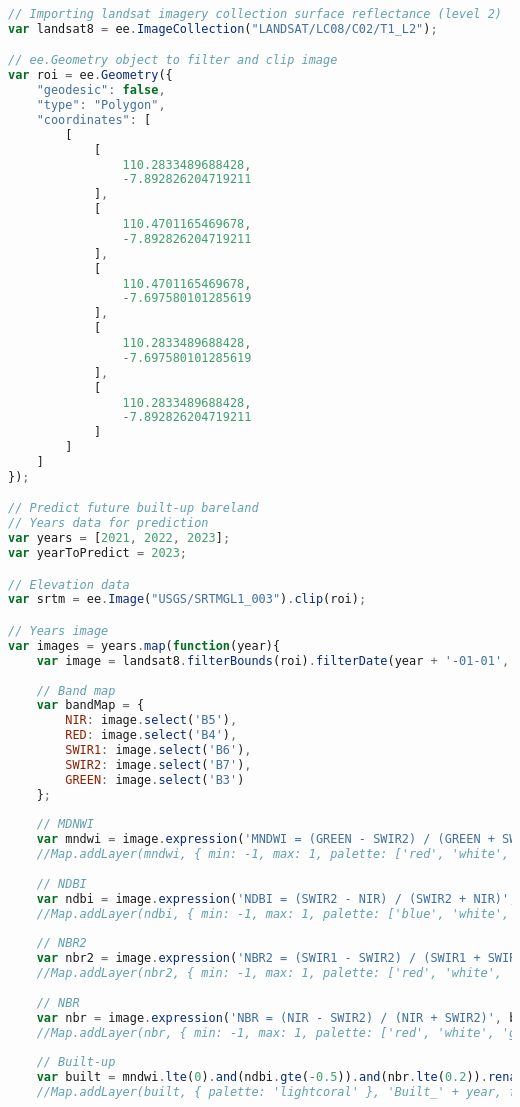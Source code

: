 \begin{lstlisting}[language=JavaScript, label={code:futureLst}, caption={GEE Script to predict future LST}]
// Importing landsat imagery collection surface reflectance (level 2)
var landsat8 = ee.ImageCollection("LANDSAT/LC08/C02/T1_L2");

// ee.Geometry object to filter and clip image
var roi = ee.Geometry({
	"geodesic": false,
	"type": "Polygon",
	"coordinates": [
		[
			[
				110.2833489688428,
				-7.892826204719211
			],
			[
				110.4701165469678,
				-7.892826204719211
			],
			[
				110.4701165469678,
				-7.697580101285619
			],
			[
				110.2833489688428,
				-7.697580101285619
			],
			[
				110.2833489688428,
				-7.892826204719211
			]
		]
	]
});

// Predict future built-up bareland
// Years data for prediction
var years = [2021, 2022, 2023];
var yearToPredict = 2023;

// Elevation data
var srtm = ee.Image("USGS/SRTMGL1_003").clip(roi);

// Years image
var images = years.map(function(year){
	var image = landsat8.filterBounds(roi).filterDate(year + '-01-01', year + '-12-31').map(cloudMaskOli).median().clip(roi);
	
	// Band map
	var bandMap = {
		NIR: image.select('B5'),
		RED: image.select('B4'),
		SWIR1: image.select('B6'),
		SWIR2: image.select('B7'),
		GREEN: image.select('B3')
	};
	
	// MDNWI
	var mndwi = image.expression('MNDWI = (GREEN - SWIR2) / (GREEN + SWIR2)', bandMap);
	//Map.addLayer(mndwi, { min: -1, max: 1, palette: ['red', 'white', 'blue']}, 'MNDWI_' + year, false);
	
	// NDBI
	var ndbi = image.expression('NDBI = (SWIR2 - NIR) / (SWIR2 + NIR)', bandMap);
	//Map.addLayer(ndbi, { min: -1, max: 1, palette: ['blue', 'white', 'red']}, 'NDBI_' + year, false);
	
	// NBR2
	var nbr2 = image.expression('NBR2 = (SWIR1 - SWIR2) / (SWIR1 + SWIR2)', bandMap);
	//Map.addLayer(nbr2, { min: -1, max: 1, palette: ['red', 'white', 'green']}, 'NBR2_' + year, false);
	
	// NBR
	var nbr = image.expression('NBR = (NIR - SWIR2) / (NIR + SWIR2)', bandMap);
	//Map.addLayer(nbr, { min: -1, max: 1, palette: ['red', 'white', 'green']}, 'NBR_' + year, false);
	
	// Built-up
	var built = mndwi.lte(0).and(ndbi.gte(-0.5)).and(nbr.lte(0.2)).rename('built');
	//Map.addLayer(built, { palette: 'lightcoral' }, 'Built_' + year, false);
	

\end{lstlisting}
